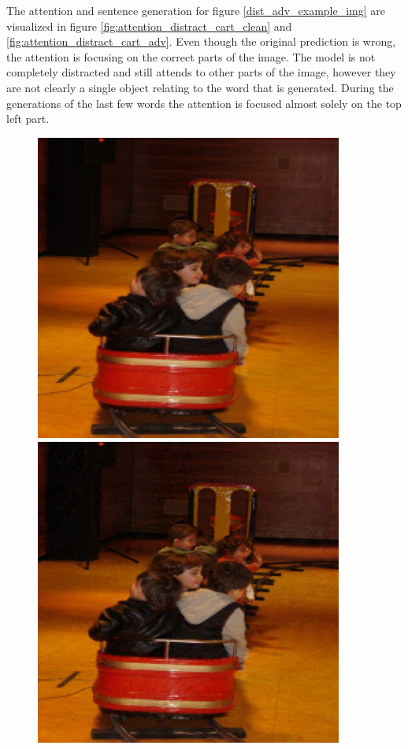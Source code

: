 The attention and sentence generation for figure \ref{dist_adv_example_img} are visualized in figure \ref{fig:attention_distract_cart_clean} and \ref{fig:attention_distract_cart_adv}. Even though the original prediction is wrong, the attention is focusing on the correct parts of the image. The model is not completely distracted and still attends to other parts of the image, however they are not clearly a single object relating to the word that is generated. During the generations of the last few words the attention is focused almost solely on the top left part.

\begin{figure}[h]
    \centering
    \begin{minipage}{0.45\textwidth}
        \centering
        \includegraphics[width=0.9\textwidth]{figures/distraction_adv_sample_0.png} %
    \end{minipage}\hfill
    \begin{minipage}{0.45\textwidth}
        \centering
        \includegraphics[width=0.9\textwidth]{figures/distraction_adv_sample_0.04.png} %

\end{minipage}
\end{figure}
